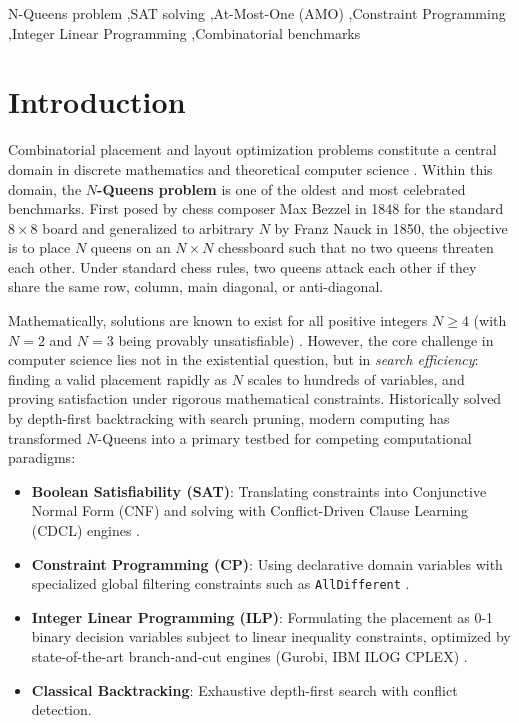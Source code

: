 \documentclass[a4paper,fleqn]{cas-sc}
\begin{document}
\begin{keywords}
N-Queens problem \sep SAT solving \sep At-Most-One (AMO) \sep Constraint Programming \sep Integer Linear Programming \sep Combinatorial benchmarks
\end{keywords}

\maketitle

\section{Introduction}
\label{sec:introduction}

Combinatorial placement and layout optimization problems constitute a central domain in discrete mathematics and theoretical computer science \cite{cook1971complexity,biere2021handbook}. Within this domain, the \textbf{$N$-Queens problem} is one of the oldest and most celebrated benchmarks. First posed by chess composer Max Bezzel in 1848 for the standard $8 \times 8$ board and generalized to arbitrary $N$ by Franz Nauck in 1850, the objective is to place $N$ queens on an $N \times N$ chessboard such that no two queens threaten each other. Under standard chess rules, two queens attack each other if they share the same row, column, main diagonal, or anti-diagonal.

Mathematically, solutions are known to exist for all positive integers $N \ge 4$ (with $N=2$ and $N=3$ being provably unsatisfiable) \cite{bell2009survey}. However, the core challenge in computer science lies not in the existential question, but in \textit{search efficiency}: finding a valid placement rapidly as $N$ scales to hundreds of variables, and proving satisfaction under rigorous mathematical constraints. Historically solved by depth-first backtracking with search pruning, modern computing has transformed $N$-Queens into a primary testbed for competing computational paradigms:
\begin{itemize}[noitemsep]
    \item \textbf{Boolean Satisfiability (SAT)}: Translating constraints into Conjunctive Normal Form (CNF) and solving with Conflict-Driven Clause Learning (CDCL) engines \cite{fichte2023silent,biere2024cadical}.
    \item \textbf{Constraint Programming (CP)}: Using declarative domain variables with specialized global filtering constraints such as \texttt{AllDifferent} \cite{rossi2006handbook,ortools}.
    \item \textbf{Integer Linear Programming (ILP)}: Formulating the placement as 0-1 binary decision variables subject to linear inequality constraints, optimized by state-of-the-art branch-and-cut engines (Gurobi, IBM ILOG CPLEX) \cite{gurobi,cplex}.
    \item \textbf{Classical Backtracking}: Exhaustive depth-first search with conflict detection.
\end{itemize}
\end{document}
